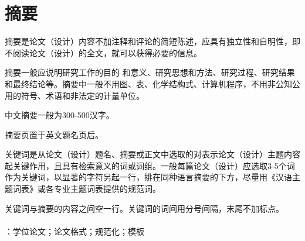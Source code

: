 \cleardoublepage
\pagestyle{fancy}




{}

\section*{摘\quad 要}

摘要是论文（设计）内容不加注释和评论的简短陈述，应具有独立性和自明性，即不阅读论文（设计）的全文，就可以获得必要的信息。\par 
摘要一般应说明研究工作的目的 和意义、研究思想和方法、研究过程、研究结果和最终结论等。摘要中一般不用图、表、化学结构式、计算机程序，不用非公知公用的符号、术语和非法定的计量单位。\par 
中文摘要一般为300-500汉字。\par 
摘要页置于英文题名页后。 \par 
关键词是从论文（设计）题名、摘要或正文中选取的对表示论文（设计）主题内容起关键作用，且具有检索意义的词或词组。一般每篇论文（设计）应选取3-5个词作为关键词，以显著的字符另起一行，排在同种语言摘要的下方，尽量用《汉语主题词表》或各专业主题词表提供的规范词。\par 
关键词与摘要的内容之间空一行。关键词的词间用分号间隔，末尾不加标点。\\
~\\
：学位论文；论文格式；规范化；模板\\
